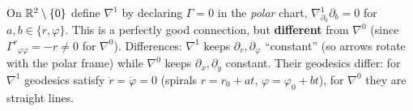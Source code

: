\begin{example}
On $\mathbb{R}^2\setminus\{0\}$ define $\nabla^1$ by declaring $\Gamma=0$ in the \emph{polar} chart, \ie $\nabla^1_{\partial_a}\partial_b=0$ for $a,b\in\{r,\varphi\}$. This is a perfectly good connection, but \textbf{different} from $\nabla^0$ (since $\Gamma^r{}_{\varphi\varphi}=-r\neq0$ for $\nabla^0$). Differences: $\nabla^1$ keeps $\partial_r,\partial_\varphi$ ``constant'' (so arrows rotate with the polar frame) while $\nabla^0$ keeps $\partial_x,\partial_y$ constant. Their geodesics differ: for $\nabla^1$ geodesics satisfy $\ddot r=\ddot\varphi=0$ (spirals $r=r_0+at$, $\varphi=\varphi_0+bt$), for $\nabla^0$ they are straight lines.
\end{example}
